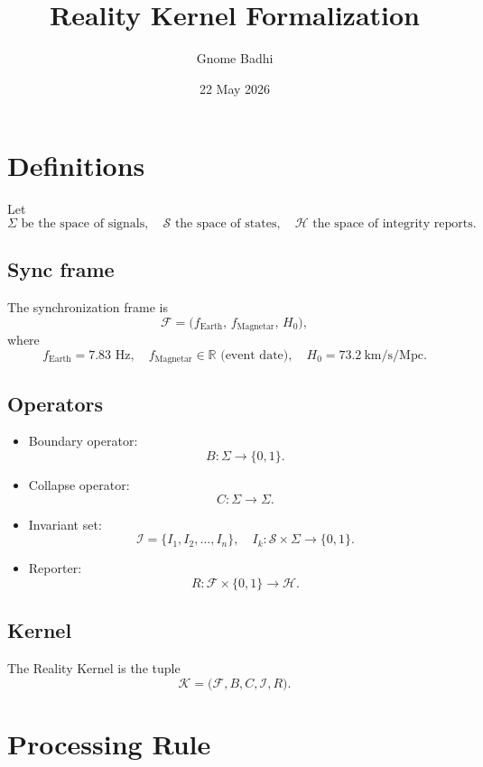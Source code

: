 \documentclass[12pt]{article}
\begin{document}
\title{Reality Kernel Formalization}
\author{Gnome Badhi}
\date{22 May 2026}
\maketitle

\section*{Definitions}

Let
\[
\Sigma \text{ be the space of signals}, \quad
\mathcal{S} \text{ the space of states}, \quad
\mathcal{H} \text{ the space of integrity reports}.
\]

\subsection*{Sync frame}

The synchronization frame is
\[
\mathcal{F} = \bigl(f_{\text{Earth}},\, f_{\text{Magnetar}},\, H_0\bigr),
\]
where
\[
f_{\text{Earth}} = 7.83 \text{ Hz}, \quad
f_{\text{Magnetar}} \in \mathbb{R} \text{ (event date)}, \quad
H_0 = 73.2 \ \text{km/s/Mpc}.
\]

\subsection*{Operators}

\begin{itemize}
  \item Boundary operator:
  \[
  B : \Sigma \to \{0,1\}.
  \]

  \item Collapse operator:
  \[
  C : \Sigma \to \Sigma.
  \]

  \item Invariant set:
  \[
  \mathcal{I} = \{ I_1, I_2, \dots, I_n \}, \quad
  I_k : \mathcal{S} \times \Sigma \to \{0,1\}.
  \]

  \item Reporter:
  \[
  R : \mathcal{F} \times \{0,1\} \to \mathcal{H}.
  \]
\end{itemize}

\subsection*{Kernel}

The Reality Kernel is the tuple
\[
\mathcal{K} = \bigl(\mathcal{F}, B, C, \mathcal{I}, R\bigr).
\]

\section*{Processing Rule}
\end{document}
